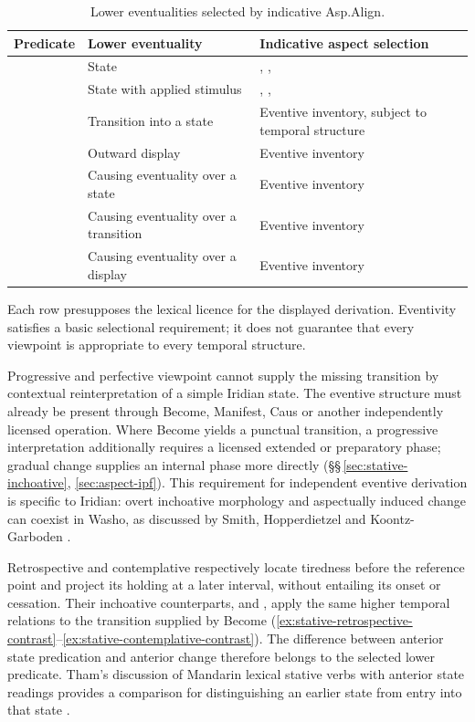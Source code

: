 \begin{table}[!ht]
\footnotesize
\caption{Lower eventualities selected by indicative Asp.Align.}
\label{tab:stative-syntax-aspect}
\begin{tabularx}{\textwidth}{l L L}
\toprule
Predicate & Lower eventuality & Indicative aspect selection \\
\midrule
{} & State & \Cont{}, \Ret{}, \Ctpl{} \\
 & State with applied stimulus & \Cont{}, \Ret{}, \Ctpl{} \\
 & Transition into a state & Eventive inventory, subject to temporal structure \\
 & Outward display & Eventive inventory \\
 & Causing eventuality over a state & Eventive inventory \\
 & Causing eventuality over a transition & Eventive inventory \\
 & Causing eventuality over a display & Eventive inventory \\
\bottomrule
\end{tabularx}
\par\smallskip
\parbox{\textwidth}{\footnotesize
Each row presupposes the lexical licence for the displayed derivation.
Eventivity satisfies a basic selectional requirement; it does not guarantee
that every viewpoint is appropriate to every temporal structure.}
\end{table}

Progressive and perfective viewpoint cannot supply the missing transition
by contextual reinterpretation of a simple Iridian state. The eventive
structure must already be present through Become, Manifest, Caus or another
independently licensed operation. Where Become yields a punctual
transition, a progressive interpretation additionally requires a licensed
extended or preparatory phase; gradual change supplies an internal phase
more directly (\S\S\,\ref{sec:stative-inchoative}, \ref{sec:aspect-ipf}).
This requirement for independent eventive derivation is specific to
Iridian: overt inchoative morphology and aspectually induced change can
coexist in Washo, as discussed by Smith, Hopperdietzel and
Koontz-Garboden \cite[\S\S3.2--3.3]{smithhopperdietzelkoontzgarboden2025}.

Retrospective  and contemplative 
respectively locate tiredness before the reference point and project its
holding at a later interval, without entailing its onset or cessation.
Their inchoative counterparts,  and
, apply the same higher temporal relations to the
transition supplied by Become
(\ref{ex:stative-retrospective-contrast}--\ref{ex:stative-contemplative-contrast}).
The difference between anterior state predication and anterior change
therefore belongs to the selected lower predicate. Tham's discussion of
Mandarin lexical stative verbs with anterior state readings provides a comparison for distinguishing an earlier state
from entry into that state \cite[\S3.3, pp.~668--670]{tham2013cos}.

